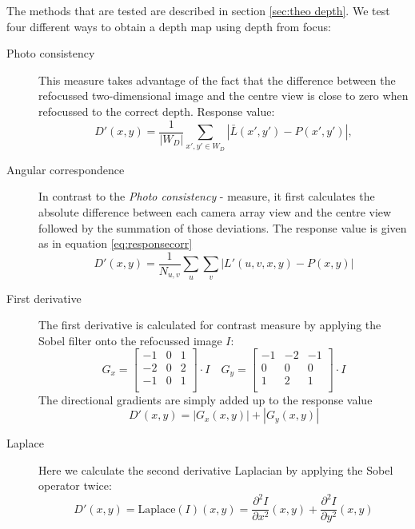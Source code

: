 \documentclass  [
  paper    = a4,
  BCOR     = 10mm,
  twoside,
  fontsize = 12pt,
  fleqn,
  toc      = bibnumbered,
  toc      = listofnumbered,
  numbers  = noendperiod,
  headings = normal,
  listof   = leveldown,
  version  = 3.03
]                                       {scrreprt}
\begin{document}
The methods that are tested are described in section \ref{sec:theo depth}. We test four different ways to obtain a depth map using depth from focus:
\begin{description}
	\item[Photo consistency] This measure takes advantage of the fact that the difference between the refocussed two-dimensional image and the centre view is close to zero when refocussed to  the correct depth. Response value:
	\begin{equation}\label{key}
	D'(x,y) = \frac{1}{|W_D|}\sum_{x',y' \in W_D} \left|\bar{L}(x',y')- P(x', y')\right|,
	\end{equation}
	\item[Angular correspondence] In contrast to the \textit{Photo consistency} - measure, it first calculates the absolute difference between each camera array view and the centre view followed by the summation of those deviations. The response value is given as in equation \eqref{eq:responsecorr}
	\begin{equation}\label{key}
	D'(x,y) = \frac{1}{N_{u,v}}\sum_{u}\sum_{v}  \left|L'(u, v, x, y) - P(x,y)\right|
	\end{equation}
	
	\item[First derivative] The first derivative is calculated for contrast measure by applying the Sobel filter onto the refocussed image $I$:
	\begin{equation}\label{key}
	 G_x=
	 \left[ {\begin{array}{ccc}
	 	-1 & 0 & 1 \\
	 	-2 & 0 & 2 \\
	 	-1 & 0 & 1 \\
	 	\end{array} } \right] \cdot I \quad G_y=
	 \left[ {\begin{array}{ccc}
	 	-1 &-2 &-1 \\
	 	0 & 0 & 0 \\
	 	1 & 2 & 1 \\
	 	\end{array} } \right] \cdot I
	\end{equation} 
	The directional gradients are simply added up to the response value
	\begin{equation}\label{key}
	D'(x,y) = |G_x(x,y)| + |G_y(x,y)|
	\end{equation}
	\item[Laplace] Here we calculate the second derivative Laplacian by applying the Sobel operator twice:\begin{equation}\label{key}
	D'(x,y) = \text{Laplace}(I)(x,y) = \frac{\partial^2 I}{\partial x^2}(x,y) + \frac{\partial^2 I}{\partial y^2}(x,y)
	\end{equation}
\end{description}
\end{document}
